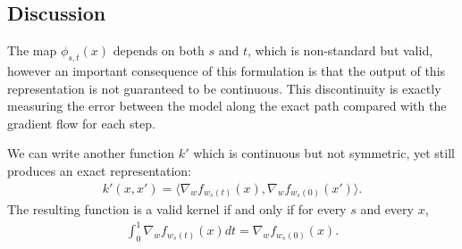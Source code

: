 
\subsection{Discussion}


The map $\phi_{s,t}(x)$ depends on both $s$ and $t$, which is non-standard but valid, however an important consequence of this formulation is that the output of this representation is not guaranteed to be continuous. This discontinuity is exactly measuring the error between the model along the exact path compared with the gradient flow for each step. 

We can write another function $k'$ which is continuous but not symmetric, yet still produces an exact representation:
\begin{align}
k'(x, x') = \langle \nabla_w f_{w_s(t)}(x), \nabla_w f_{w_s(0)}(x')\rangle.
\end{align}
The resulting function is a valid kernel if and only if for every $s$ and every $x$, 
\begin{align}
\label{eq:cond}
    \int_0^1 \nabla_w f_{w_s(t)}(x)dt = \nabla_w f_{w_s(0)}(x).
\end{align}

